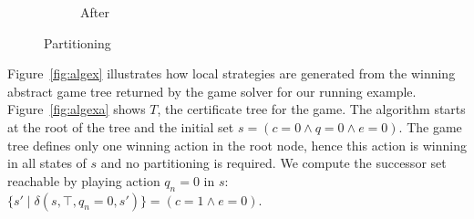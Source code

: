 \begin{figure}[b]
\begin{subfigure}[t]{.3\textwidth}
\begin{minipage}[t][3cm][t]{\textwidth}
        \end{minipage}
        \caption{After}
    \end{subfigure}%
    \hspace*{\fill}
    \caption{Partitioning}
    \label{fig:partition}
\end{figure}

Figure~\ref{fig:algex} illustrates how local strategies are generated from the winning abstract game tree returned by the game solver for our running example.  Figure~\ref{fig:algexa} shows $T$, the certificate tree for the game. The algorithm starts at the root of the tree and the initial set $s = (c = 0 \land q = 0 \land e = 0)$.  The game tree defines only one winning action in the root node, hence this action is winning in all states of $s$ and no partitioning is required.  We compute the successor set reachable by playing action $q_n = 0$ in $s$: $\{ s' \mid \delta(s, \top, q_n = 0, s') \} = (c = 1 \land e = 0) $.

